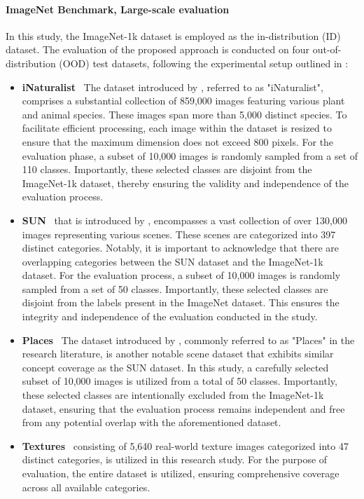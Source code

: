 \documentclass{article}
\begin{document}
\paragraph{ImageNet Benchmark, Large-scale evaluation}  In this study, the ImageNet-1k dataset \cite{deng2009imagenet} is employed as the in-distribution (ID) dataset. The evaluation of the proposed approach is conducted on four out-of-distribution (OOD) test datasets, following the experimental setup outlined in \cite{huang2021importance}:
\begin{itemize}
    \item \textbf{iNaturalist}~ The dataset introduced by \cite{van2018inaturalist}, referred to as "iNaturalist", comprises a substantial collection of 859,000 images featuring various plant and animal species. These images span more than 5,000 distinct species. To facilitate efficient processing, each image within the dataset is resized to ensure that the maximum dimension does not exceed 800 pixels. For the evaluation phase, a subset of 10,000 images is randomly sampled from a set of 110 classes. Importantly, these selected classes are disjoint from the ImageNet-1k dataset, thereby ensuring the validity and independence of the evaluation process.

    \item \textbf{SUN}~ that is introduced by \citeauthor{xiao2010sun}, encompasses a vast collection of over 130,000 images representing various scenes. These scenes are categorized into 397 distinct categories. Notably, it is important to acknowledge that there are overlapping categories between the SUN dataset and the ImageNet-1k dataset. For the evaluation process, a subset of 10,000 images is randomly sampled from a set of 50 classes. Importantly, these selected classes are disjoint from the labels present in the ImageNet dataset. This ensures the integrity and independence of the evaluation conducted in the study.
    \vspace{-0.1cm}
    \item \textbf{Places}~ 
The dataset introduced by \cite{zhou2017places}, commonly referred to as "Places" in the research literature, is another notable scene dataset that exhibits similar concept coverage as the SUN dataset. In this study, a carefully selected subset of 10,000 images is utilized from a total of 50 classes. Importantly, these selected classes are intentionally excluded from the ImageNet-1k dataset, ensuring that the evaluation process remains independent and free from any potential overlap with the aforementioned dataset.
    \item \textbf{Textures}~\cite{cimpoi14describing} consisting of 5,640 real-world texture images categorized into 47 distinct categories, is utilized in this research study. For the purpose of evaluation, the entire dataset is utilized, ensuring comprehensive coverage across all available categories.
\end{itemize}
\end{document}
